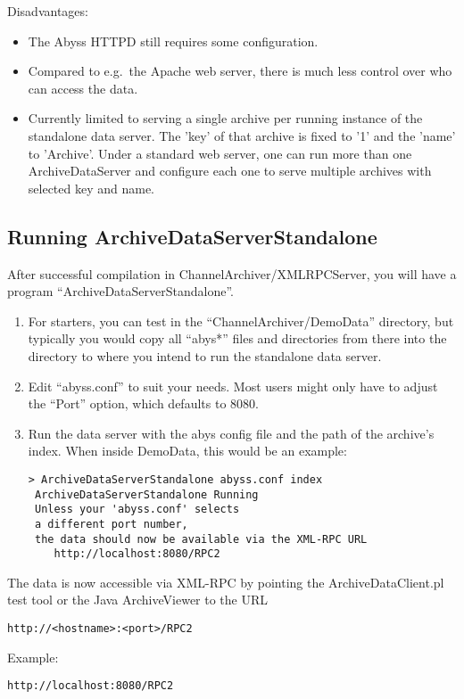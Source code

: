 \noindent Disadvantages:
\begin{itemize}
\item The Abyss HTTPD still requires some configuration.
\item Compared to e.g.\ the Apache web server, there is much less
  control over who can access the data.
\item Currently limited to serving a single archive per running
  instance of the standalone data server.
  The 'key' of that archive is fixed to '1' and  the 'name' to 'Archive'.
  Under a standard web server, one can run more than one
  ArchiveDataServer and configure each one to serve multiple archives
  with selected key and name.
\end{itemize}

\subsection{Running ArchiveDataServerStandalone} %
After successful compilation in ChannelArchiver/XMLRPCServer, you will
have a program ``ArchiveDataServerStandalone''.

\begin{enumerate}
\item For starters, you can test in the ``ChannelArchiver/DemoData''
      directory, but typically you would copy all ``abys*'' files and
      directories from there into the directory to where you intend to
      run the standalone data server.
\item Edit ``abyss.conf'' to suit your needs. Most users might only
      have to adjust the ``Port'' option, which defaults to 8080.
\item Run the data server with the abys config file and the path of
  the archive's index. When inside DemoData, this would be an example:
\begin{lstlisting}[keywordstyle=\sffamily]
> ArchiveDataServerStandalone abyss.conf index 
 ArchiveDataServerStandalone Running
 Unless your 'abyss.conf' selects
 a different port number,
 the data should now be available via the XML-RPC URL
    http://localhost:8080/RPC2
\end{lstlisting}
\end{enumerate}

\noindent The data is now accessible via XML-RPC by
pointing the ArchiveDataClient.pl test tool or the Java
ArchiveViewer to the URL
\begin{lstlisting}[keywordstyle=\sffamily]
     http://<hostname>:<port>/RPC2
\end{lstlisting}
\noindent Example:
\begin{lstlisting}[keywordstyle=\sffamily]
    http://localhost:8080/RPC2
\end{lstlisting}

